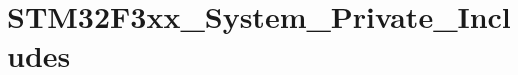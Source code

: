 \hypertarget{group___s_t_m32_f3xx___system___private___includes}{}\section{S\+T\+M32\+F3xx\+\_\+\+System\+\_\+\+Private\+\_\+\+Includes}
\label{group___s_t_m32_f3xx___system___private___includes}
